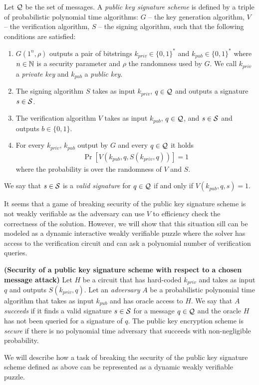 \begin{definition}
Let $\mathcal{Q}$ be the set of messages. A \textit{public key signature scheme} is defined by a triple of probabilistic polynomial time algorithms:
$G$ -- the key generation algorithm,
$V$ -- the verification algorithm,
$S$ -- the signing algorithm,
such that the following conditions are satisfied:
\begin{enumerate}[-]
  \item $G(1^n, \rho)$ outputs a pair of bitstrings $k_{priv} \in \{0,1\}^{*}$ and $k_{pub} \in \{0,1\}^{*}$ where $n \in \mathbb{N}$ is a security
    parameter and $\rho$ the randomness used by $G$. We call $k_{priv}$ a \textit{private key} and $k_{pub}$ a \textit{public key}.
  \item The signing algorithm $S$ takes as input $k_{priv}$, $q \in \mathcal{Q}$ and outputs a signature $s \in \mathcal{S}$.
  \item The verification algorithm $V$ takes as input $k_{pub}$, $q \in \mathcal{Q}$, and $s \in \mathcal{S}$ and outputs $b \in \{0,1\}$.
  \item For every $k_{priv}$, $k_{pub}$ output by $G$ and every $q \in \mathcal{Q}$ it holds
    \begin{align*}
      \Pr[V(k_{pub}, q, S(k_{priv}, q))] = 1
    \end{align*}
    where the probability is over the randomness of $V$ and $S$.
\end{enumerate}
\end{definition}
We say that $s \in \mathcal{S}$ is a \textit{valid signature} for $q \in \mathcal{Q}$ if and only if $V(k_{pub}, q, s) = 1$.

It seems that a game of breaking security of the public key signature scheme is not weakly verifiable as the adversary can use $V$
to efficiency check the correctness of the solution. However, we will show that this situation sill can be modeled as a dynamic interactive weakly verifiable puzzle
where the solver has access to the verification circuit and can ask a polynomial number of verification queries.
%
\begin{definition}\textbf{(Security of a public key signature scheme with respect to a chosen message attack)}
  \label{def:sec_sig}
Let $H$ be a circuit that has hard-coded $k_{priv}$ and takes as input $q$ and outputs $S(k_{priv}, q)$.
Let an \textit{adversary} $A$ be a probabilistic polynomial time algorithm that takes as input $k_{pub}$ and has oracle access to $H$.
We say that $A$ \textit{succeeds} if it finds a valid signature $s \in \mathcal{S}$ for a message $q \in \mathcal{Q}$ and the oracle $H$ has not been queried for a signature of $q$.
The public key encryption scheme is \textit{secure} if there is no polynomial time adversary that succeeds with non-negligible probability.
\end{definition}
%
We will describe how a task of breaking the security of the public key signature scheme defined
as above can be represented as a dynamic weakly verifiable puzzle.

